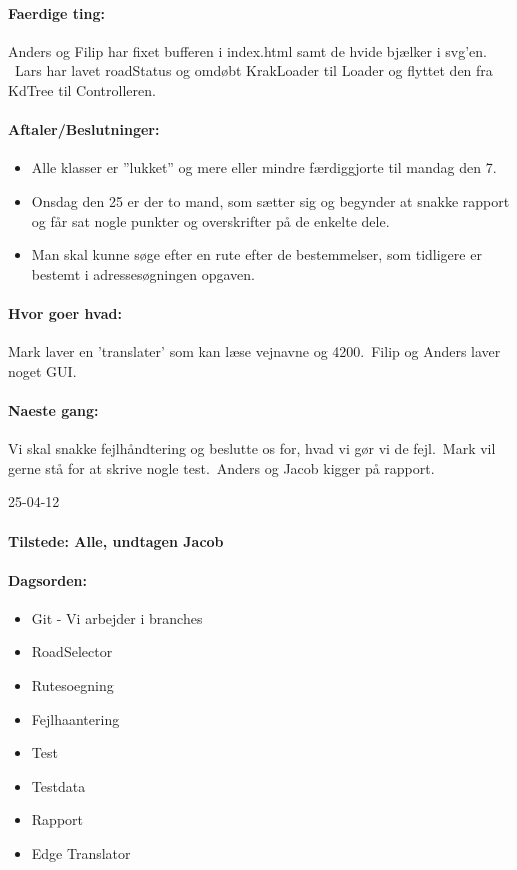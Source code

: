\documentclass[a4paper,10pt,titlepage]{article}
\begin{document}
		\paragraph{Faerdige ting:}
		Anders og Filip har fixet bufferen i index.html samt de hvide bjælker i svg’en. \
Lars har lavet roadStatus og omdøbt KrakLoader til Loader og flyttet den fra KdTree til Controlleren. 

		\paragraph{Aftaler/Beslutninger:}
		\begin{itemize}
		\item Alle klasser er ”lukket” og mere eller mindre færdiggjorte til mandag den 7.
\item Onsdag den 25 er der to mand, som sætter sig og begynder at snakke rapport og får sat nogle punkter og overskrifter på de enkelte dele.
\item Man skal kunne søge efter en rute efter de bestemmelser, som tidligere er bestemt i adressesøgningen opgaven.  
		\end{itemize}
		\paragraph{Hvor goer hvad:}
		Mark laver en ’translater’ som kan læse vejnavne og 4200.\
Filip og Anders laver noget GUI.

		\paragraph{Naeste gang:}
Vi skal snakke fejlhåndtering og beslutte os for, hvad vi gør vi de fejl.\
 Mark vil gerne stå for at skrive nogle test.\
Anders og Jacob kigger på rapport.\mbox{}\\

\begin{center}
		25-04-12
		\end{center}
		
		\paragraph{Tilstede: Alle, undtagen Jacob}
		\paragraph{Dagsorden:}
		\begin{itemize}
					\item Git - Vi arbejder i branches 
					\item RoadSelector
					\item Rutesoegning
					\item Fejlhaantering
					\item Test
					\item Testdata
					\item Rapport
					\item Edge Translator
		\end{itemize}
		
\end{document}
